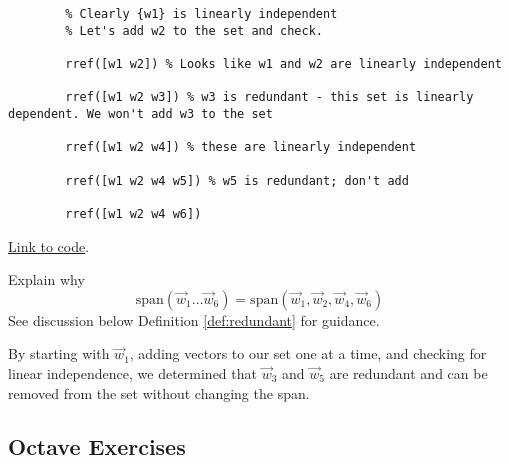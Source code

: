 \documentclass{ximera}
\begin{document}
\begin{example}
\begin{explanation}
\begin{verbatim}
        % Clearly {w1} is linearly independent
        % Let's add w2 to the set and check.

        rref([w1 w2]) % Looks like w1 and w2 are linearly independent

        rref([w1 w2 w3]) % w3 is redundant - this set is linearly dependent. We won't add w3 to the set

        rref([w1 w2 w4]) % these are linearly independent

        rref([w1 w2 w4 w5]) % w5 is redundant; don't add

        rref([w1 w2 w4 w6])
    \end{verbatim}

        \href{https://sagecell.sagemath.org/?z=eJyNj09rgzAYxu-C3-G5lK4HS2PUdgRP23H3HcSDmLdUlDg0bShj331vIhst22AQcvjl-ZcVnunYGYI9ES7U2nGa0RndXTp9bobhGkdx5ERZiVRB7BSSlK-8VkzTspIMRKaQCn4VgcqySgrG8qBQeNM-4KysWJd4LZvEY4D5ouWT7RXkLsCirLzNJzI8eBZHKzwN1EzDFe9OfKCbMfDqAHgtvRFfxnrdC9n1jEZruBR2DB-byaIxGu2J2n7r86aJjg-VEyyqN2DXOPY-sycw9Fp2NxP9UXMXACdDhpN-10T6bHRjLBLuZuDLb_d-x2zxym2jWdtlrryZ-6MiCxX8OtP_d2Vw-TItv5umoL9qf_MU9eYT4y-cZg==&lang=octave&interacts=eJyLjgUAARUAuQ==}{Link to code}.

        \begin{question}
        Explain why $$\text{span}(\vec{w}_1\dots\vec{w}_6)=\text{span}(\vec{w}_1, \vec{w}_2, \vec{w}_4, \vec{w}_6)$$
        See discussion below Definition \ref{def:redundant} for guidance.
        \end{question}

        By starting with $\vec{w}_1$, adding vectors to our set one at a time, and checking for linear independence, we determined that $\vec{w}_3$ and $\vec{w}_5$ are redundant and can be removed from the set without changing the span.

    \end{explanation}
\end{example}

\subsection*{Octave Exercises}
\end{document}
